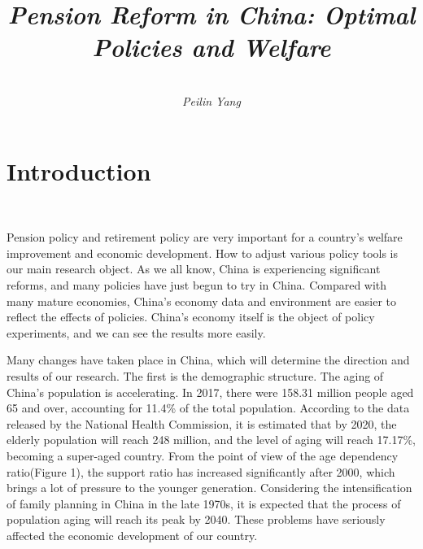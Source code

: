 \documentclass{article}
\title{\textbf{} \\ {\Large\itshape Pension Reform in China: Optimal Policies and Welfare }} %
\author{\textbf{} \\ \textit{Peilin Yang}} %
\begin{document}
\maketitle
\begin{abstract}

    \setlength{\parindent}{0pt} \setlength{\parskip}{1.5ex plus 0.5ex
    minus 0.2ex} %

\end{abstract}
 
\section{Introduction}
    ~\

    Pension policy and retirement policy are very important for a country's welfare improvement and economic development. How to adjust various policy tools is our main research object. As we all know, China is experiencing significant reforms, and many policies have just begun to try in China. Compared with many mature economies, China's economy data and environment are easier to reflect the effects of policies. China's economy itself is the object of policy experiments, and we can see the results more easily.
    
    
    Many changes have taken place in China, which will determine the direction and results of our research. The first is the demographic structure. The aging of China's population is accelerating. In 2017, there were 158.31 million people aged 65 and over, accounting for 11.4\% of the total population. According to the data released by the National Health Commission, it is estimated that by 2020, the elderly population will reach 248 million, and the level of aging will reach 17.17\%, becoming a super-aged country. From the point of view of the age dependency ratio(Figure 1), the support ratio has increased significantly after 2000, which brings a lot of pressure to the younger generation. Considering the intensification of family planning in China in the late 1970s, it is expected that the process of population aging will reach its peak by 2040. These problems have seriously affected the economic development of our country.

\end{document}
